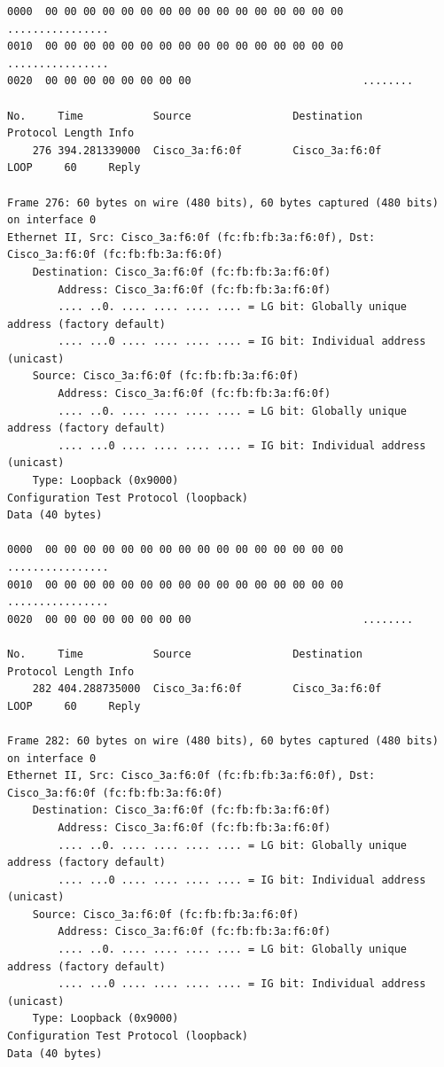 \documentclass[a4paper,11pt]{article}
\begin{document}
\begin{lstlisting}
0000  00 00 00 00 00 00 00 00 00 00 00 00 00 00 00 00   ................
0010  00 00 00 00 00 00 00 00 00 00 00 00 00 00 00 00   ................
0020  00 00 00 00 00 00 00 00                           ........

No.     Time           Source                Destination           Protocol Length Info
    276 394.281339000  Cisco_3a:f6:0f        Cisco_3a:f6:0f        LOOP     60     Reply

Frame 276: 60 bytes on wire (480 bits), 60 bytes captured (480 bits) on interface 0
Ethernet II, Src: Cisco_3a:f6:0f (fc:fb:fb:3a:f6:0f), Dst: Cisco_3a:f6:0f (fc:fb:fb:3a:f6:0f)
    Destination: Cisco_3a:f6:0f (fc:fb:fb:3a:f6:0f)
        Address: Cisco_3a:f6:0f (fc:fb:fb:3a:f6:0f)
        .... ..0. .... .... .... .... = LG bit: Globally unique address (factory default)
        .... ...0 .... .... .... .... = IG bit: Individual address (unicast)
    Source: Cisco_3a:f6:0f (fc:fb:fb:3a:f6:0f)
        Address: Cisco_3a:f6:0f (fc:fb:fb:3a:f6:0f)
        .... ..0. .... .... .... .... = LG bit: Globally unique address (factory default)
        .... ...0 .... .... .... .... = IG bit: Individual address (unicast)
    Type: Loopback (0x9000)
Configuration Test Protocol (loopback)
Data (40 bytes)

0000  00 00 00 00 00 00 00 00 00 00 00 00 00 00 00 00   ................
0010  00 00 00 00 00 00 00 00 00 00 00 00 00 00 00 00   ................
0020  00 00 00 00 00 00 00 00                           ........

No.     Time           Source                Destination           Protocol Length Info
    282 404.288735000  Cisco_3a:f6:0f        Cisco_3a:f6:0f        LOOP     60     Reply

Frame 282: 60 bytes on wire (480 bits), 60 bytes captured (480 bits) on interface 0
Ethernet II, Src: Cisco_3a:f6:0f (fc:fb:fb:3a:f6:0f), Dst: Cisco_3a:f6:0f (fc:fb:fb:3a:f6:0f)
    Destination: Cisco_3a:f6:0f (fc:fb:fb:3a:f6:0f)
        Address: Cisco_3a:f6:0f (fc:fb:fb:3a:f6:0f)
        .... ..0. .... .... .... .... = LG bit: Globally unique address (factory default)
        .... ...0 .... .... .... .... = IG bit: Individual address (unicast)
    Source: Cisco_3a:f6:0f (fc:fb:fb:3a:f6:0f)
        Address: Cisco_3a:f6:0f (fc:fb:fb:3a:f6:0f)
        .... ..0. .... .... .... .... = LG bit: Globally unique address (factory default)
        .... ...0 .... .... .... .... = IG bit: Individual address (unicast)
    Type: Loopback (0x9000)
Configuration Test Protocol (loopback)
Data (40 bytes)


\end{lstlisting}
\end{document}
